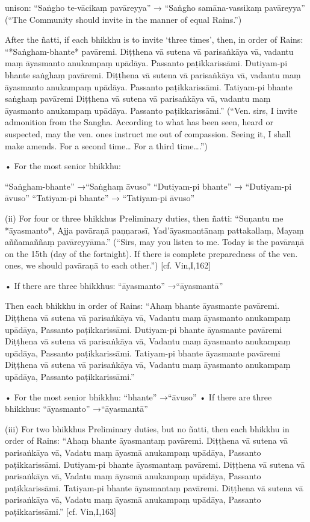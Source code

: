 unison:
“Saṅgho te-vācikaṃ pavāreyya”
→ “Saṅgho samāna-vassikaṃ pavāreyya”
(“The Community should invite
in the manner of equal Rains.”)

After the ñatti, if each bhikkhu is to invite
‘three times’, then, in order of Rains:
“*Saṅgham-bhante* pavāremi.
Diṭṭhena vā sutena vā parisaṅkāya vā,
vadantu maṃ āyasmanto anukampaṃ upādāya.
Passanto paṭikkarissāmi.
Dutiyam-pi bhante saṅghaṃ pavāremi.
Diṭṭhena vā sutena vā parisaṅkāya vā,
vadantu maṃ āyasmanto anukampaṃ upādāya.
Passanto paṭikkarissāmi.
Tatiyam-pi bhante saṅghaṃ pavāremi
Diṭṭhena vā sutena vā parisaṅkāya vā,
vadantu maṃ āyasmanto anukampaṃ upādāya.
Passanto paṭikkarissāmi.”
(“Ven. sirs, I invite admonition from the Sangha.
According to what has been seen, heard or suspected,
may the ven. ones instruct me out of compassion.
Seeing it, I shall make amends.
For a second time… For a third time….”)

• For the most senior bhikkhu:

“Saṅgham-bhante” →“Saṅghaṃ āvuso”
“Dutiyam-pi bhante” → “Dutiyam-pi āvuso”
“Tatiyam-pi bhante” → “Tatiyam-pi āvuso”

(ii) For four or three bhikkhus
Preliminary duties, then ñatti:
“Suṇantu me *āyasmanto*,
Ajja pavāraṇā paṇṇarasī,
Yad’āyasmantānaṃ pattakallaṃ,
Mayaṃ aññamaññaṃ pavāreyyāma.”
(“Sirs, may you listen to me. Today is the pavāraṇā
on the 15th (day of the fortnight). If there is
complete preparedness of the ven. ones, we should
pavāraṇā to each other.”)
[cf. Vin,I,162]

• If there are three bhikkhus:
“āyasmanto” →“āyasmantā”

Then each bhikkhu in order of Rains:
“Ahaṃ bhante āyasmante pavāremi.
Diṭṭhena vā sutena vā parisaṅkāya vā,
Vadantu maṃ āyasmanto anukampaṃ upādāya,
Passanto paṭikkarissāmi.
Dutiyam-pi bhante āyasmante pavāremi
Diṭṭhena vā sutena vā parisaṅkāya vā,
Vadantu maṃ āyasmanto anukampaṃ upādāya,
Passanto paṭikkarissāmi.
Tatiyam-pi bhante āyasmante pavāremi
Diṭṭhena vā sutena vā parisaṅkāya vā,
Vadantu maṃ āyasmanto anukampaṃ upādāya,
Passanto paṭikkarissāmi.”

• For the most senior bhikkhu:
“bhante” →“āvuso”
• If there are three bhikkhus:
“āyasmanto” →“āyasmantā”

(iii) For two bhikkhus
Preliminary duties, but no ñatti, then each
bhikkhu in order of Rains:
“Ahaṃ bhante āyasmantaṃ pavāremi.
Diṭṭhena vā sutena vā parisaṅkāya vā,
Vadatu maṃ āyasmā anukampaṃ upādāya,
Passanto paṭikkarissāmi.
Dutiyam-pi bhante āyasmantaṃ pavāremi.
Diṭṭhena vā sutena vā parisaṅkāya vā,
Vadatu maṃ āyasmā anukampaṃ upādāya,
Passanto paṭikkarissāmi.
Tatiyam-pi bhante āyasmantaṃ pavāremi.
Diṭṭhena vā sutena vā parisaṅkāya vā,
Vadatu maṃ āyasmā anukampaṃ upādāya,
Passanto paṭikkarissāmi.”
[cf. Vin,I,163]

